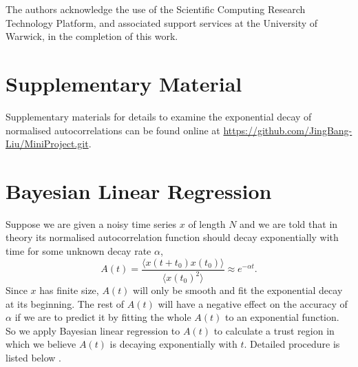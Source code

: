 \documentclass[
reprint,
 amsmath,amssymb,
 aps,
url
]{revtex4-1}
\begin{document}
\begin{acknowledgments}
The authors acknowledge the use of the Scientific Computing Research Technology Platform, and associated support services at the University of Warwick, in the completion of this work.
\end{acknowledgments}

\appendix

\section{Supplementary Material}

Supplementary materials for details to examine the exponential decay of normalised autocorrelations can be found online at \url{https://github.com/JingBang-Liu/MiniProject.git}.

\section{Bayesian Linear Regression}

Suppose we are given a noisy time series $x$ of length $N$ and we are told that in theory its normalised autocorrelation function should decay exponentially with time for some unknown decay rate $\alpha$,
\begin{equation}
	A(t) = \frac{\langle x(t+t_0)x(t_0)\rangle}{\langle x(t_0)^2\rangle} \approx e^{-\alpha t}.
\end{equation}
Since $x$ has finite size, $A(t)$ will only be smooth and fit the exponential decay at its beginning. The rest of $A(t)$ will have a negative effect on the accuracy of $\alpha$ if we are to predict it by fitting the whole $A(t)$ to an exponential function. So we apply Bayesian linear regression to $A(t)$ to calculate a trust region in which we believe $A(t)$ is decaying exponentially with $t$. Detailed procedure is listed below \cite{kermode_james_px914_2020}.
\end{document}
